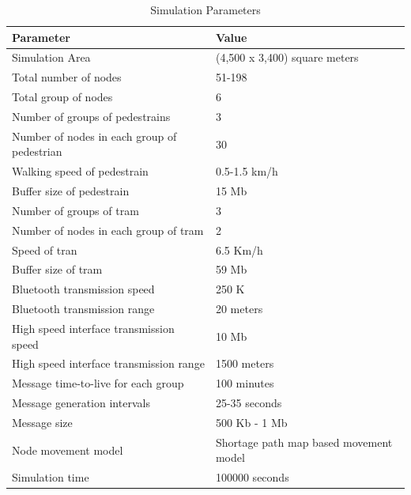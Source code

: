 \documentclass[10pt,journal]{IEEEtran}
\begin{document}
\begin{table}
\footnotesize
 \centering
  \begin{tabular}{|p{6cm}|p{6cm}|}
    \hline
    \textbf {Parameter} & \textbf {Value}  \\
     \hline
Simulation Area                             & (4,500 x 3,400) square meters          \\ \hline
Total number of nodes                       & 51-198                                    \\ \hline
Total group of nodes                        & 6                                      \\ \hline
Number of groups of pedestrains             & 3                                      \\ \hline
Number of nodes in each group of pedestrian & 30                                     \\ \hline
Walking speed of pedestrain                 & 0.5-1.5 km/h                           \\ \hline
Buffer size of pedestrain                   & 15 Mb                                  \\ \hline
Number of groups of tram                    & 3                                      \\ \hline
Number of nodes in each group of tram       & 2                                      \\ \hline
Speed of tran                               & 6.5 Km/h                               \\ \hline
Buffer size of tram                         & 59 Mb                                  \\ \hline
Bluetooth transmission speed                & 250 K                                  \\ \hline
Bluetooth transmission range                & 20 meters                              \\ \hline
High speed interface transmission speed     & 10 Mb                                  \\ \hline
High speed interface transmission range     & 1500 meters                            \\ \hline
Message time-to-live for each group         & 100  minutes                           \\ \hline
Message generation intervals                & 25-35 seconds                          \\ \hline
Message size                                & 500 Kb - 1 Mb                          \\ \hline
Node movement model                         & Shortage path map based movement model \\ \hline
Simulation time                             & 100000 seconds                         \\ \hline

  \end{tabular}
 \caption{Simulation Parameters}
  \label{issues}
\end{table}
\end{document}
